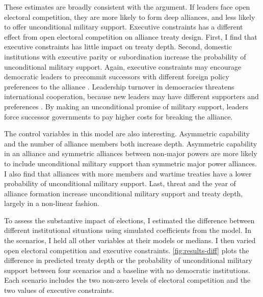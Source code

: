 \documentclass[12pt]{article}
\begin{document}
These estimates are broadly consistent with the argument. 
If leaders face open electoral competition, they are more likely to form deep alliances, and less likely to offer unconditional military support. 
Executive constraints has a different effect from open electoral competition on alliance treaty design.
First, I find that executive constraints has little impact on treaty depth.  
Second, domestic institutions with executive parity or subordination increase the probability of unconditional military support.  
Again, executive constraints may encourage democratic leaders to precommit successors with different foreign policy preferences to the alliance \cite{Mattes2012a}. 
Leadership turnover in democracies threatens international cooperation, because new leaders may have different supporters and preferences \citep{Lobell2004, Narizny2007, Leedsetal2009}. 
By making an unconditional promise of military support, leaders force successor governments to pay higher costs for breaking the alliance. 


The control variables in this model are also interesting.
Asymmetric capability and the number of alliance members both increase depth. 
Asymmetric capability in an alliance and symmetric alliances between non-major powers are more likely to include unconditional military support than symmetric major power alliances. 
I also find that alliances with more members and wartime treaties have a lower probability of unconditional military support. 
Last, threat and the year of alliance formation increase unconditional military support and treaty depth, largely in a non-linear fashion.


To assess the substantive impact of elections, I estimated the difference between different institutional situations using simulated coefficients from the model. 
In the scenarios, I held all other variables at their models or medians. 
I then varied open electoral competition and executive constraints. 
\autoref{fig:results-diff} plots the difference in predicted treaty depth or the probability of unconditional military support between four scenarios and a baseline with no democratic institutions. 
Each scenario includes the two non-zero levels of electoral competition and the two values of executive constraints. 
\end{document}
